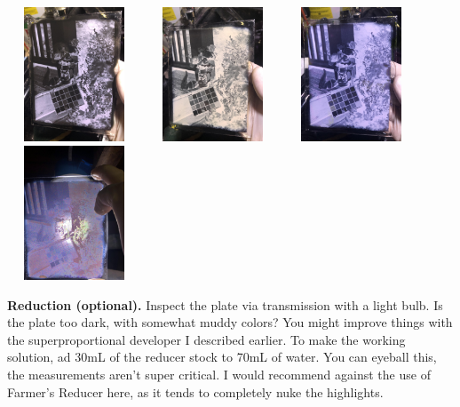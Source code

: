 \documentclass[11pt]{article}
\begin{document}
\begin{center}
\includegraphics[width=4cm, height=4cm]{img/part3_8.jpg}
\includegraphics[width=4cm, height=4cm]{img/part3_9.jpg}
\includegraphics[width=4cm, height=4cm]{img/part3_10.jpg}
\includegraphics[width=4cm, height=4cm]{img/part3_11.jpg}
\end{center}

\textbf{Reduction (optional).} Inspect the plate via transmission with a light bulb. Is the plate too dark, with somewhat muddy colors? You might improve things with the superproportional developer I described earlier. To make the working solution, ad 30mL of the reducer stock to 70mL of water. You can eyeball this, the measurements aren't super critical. I would recommend against the use of Farmer's Reducer here, as it tends to completely nuke the highlights.\newline
\end{document}
